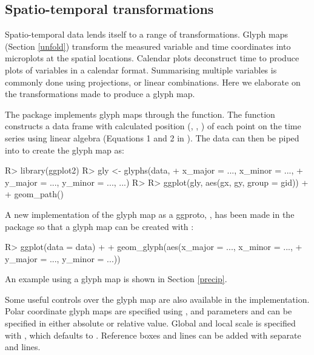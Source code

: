 \documentclass[
]{jss}
\begin{document}
\hypertarget{st_transformation}{%
\subsection{Spatio-temporal transformations}\label{st_transformation}}

Spatio-temporal data lends itself to a range of transformations. Glyph maps (Section \ref{unfold}) transform the measured variable and time coordinates into microplots at the spatial locations. Calendar plots \citep{wang2020calendar} deconstruct time to produce plots of variables in a calendar format. Summarising multiple variables is commonly done using projections, or linear combinations. Here we elaborate on the transformations made to produce a glyph map.

The  package  implements glyph maps through the  function. The function constructs a data frame with calculated position (, , ) of each point on the time series using linear algebra (Equations 1 and 2 in \citet{Wickham2012-yr}). The data can then be piped into  to create the glyph map as:

\begin{CodeChunk}
\begin{CodeInput}
R> library(ggplot2)
R> gly <- glyphs(data,
+               x_major = ..., x_minor = ...,
+               y_major = ..., y_minor = ..., ...)
R> 
R> ggplot(gly, aes(gx, gy, group = gid)) +
+   geom_path()
\end{CodeInput}
\end{CodeChunk}

A new implementation of the glyph map as a ggproto, , has been made in the  package so that a glyph map can be created with :

\begin{CodeChunk}
\begin{CodeInput}
R> ggplot(data = data) +
+   geom_glyph(aes(x_major = ..., x_minor = ...,
+                  y_major = ..., y_minor = ...))
\end{CodeInput}
\end{CodeChunk}

An example using a glyph map is shown in Section \ref{precip}.

Some useful controls over the glyph map are also available in the  implementation. Polar coordinate glyph maps are specified using , and parameters  and  can be specified in either absolute or relative value. Global and local scale is specified with , which defaults to . Reference boxes and lines can be added with separate  and  lines.
\end{document}
